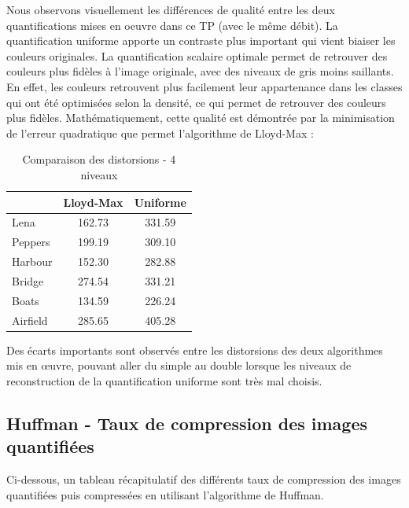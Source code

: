 \documentclass[a4paper, 12pt]{article}
\begin{document}
Nous observons visuellement les différences de qualité entre les deux quantifications mises en oeuvre dans ce TP (avec le même débit). La quantification uniforme apporte un contraste plus important qui vient biaiser les couleurs originales. La quantification scalaire optimale permet de retrouver des couleurs plus fidèles à l'image originale, avec des niveaux de gris moins saillants. En effet, les couleurs retrouvent plus facilement leur appartenance dans les classes qui ont été optimisées selon la densité, ce qui permet de retrouver des couleurs plus fidèles. Mathématiquement, cette qualité est démontrée par la minimisation de l'erreur quadratique que permet l'algorithme de Lloyd-Max :

\begin{table}[!h]
	\centering
		\begin{tabular}{l|c|c|}
			\cline{2-3}
			                               & Lloyd-Max & Uniforme \\
			\hline
			\multicolumn{1}{|l|}{Lena}     & 162.73    &  331.59  \\
			\hline
			\multicolumn{1}{|l|}{Peppers}  & 199.19    &  309.10  \\
			\hline
			\multicolumn{1}{|l|}{Harbour}  & 152.30    &  282.88  \\
			\hline
			\multicolumn{1}{|l|}{Bridge}   & 274.54    &  331.21  \\
			\hline
			\multicolumn{1}{|l|}{Boats}    & 134.59    &  226.24  \\
			\hline
			\multicolumn{1}{|l|}{Airfield} & 285.65    &  405.28  \\
			\hline
		\end{tabular}
	\caption{Comparaison des distorsions - 4 niveaux}
	\label{tab:TableComparaisonDisto}
\end{table}

Des écarts importants sont observés entre les distorsions des deux algorithmes mis en œuvre, pouvant aller du simple au double lorsque les niveaux de reconstruction de la quantification uniforme sont très mal choisis. \\


\subsection{Huffman - Taux de compression des images quantifiées}

Ci-dessous, un tableau récapitulatif des différents taux de compression des images quantifiées puis compressées en utilisant l'algorithme de Huffman.
\end{document}
